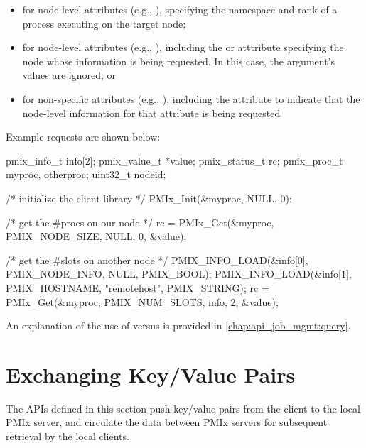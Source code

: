 \begin{itemize}
\item for node-level attributes (e.g., ), specifying the namespace and rank of a process executing on the target node;
\item for node-level attributes (e.g., ), including the  or  atttribute specifying the node whose information is being requested. In this case, the  argument's values are ignored; or
\item for non-specific attributes (e.g., ), including the  attribute to indicate that the node-level information for that attribute is being requested
\end{itemize}

Example requests are shown below:

\cspecificstart
\begin{codepar}
pmix_info_t info[2];
pmix_value_t *value;
pmix_status_t rc;
pmix_proc_t myproc, otherproc;
uint32_t nodeid;

/* initialize the client library */
PMIx_Init(&myproc, NULL, 0);

/* get the #procs on our node */
rc = PMIx_Get(&myproc, PMIX_NODE_SIZE, NULL, 0, &value);

/* get the #slots on another node */
PMIX_INFO_LOAD(&info[0], PMIX_NODE_INFO, NULL, PMIX_BOOL);
PMIX_INFO_LOAD(&info[1], PMIX_HOSTNAME, "remotehost", PMIX_STRING);
rc = PMIx_Get(&myproc, PMIX_NUM_SLOTS, info, 2, &value);

\end{codepar}
\cspecificend

\adviceuserstart
An explanation of the use of  versus  is provided in \ref{chap:api_job_mgmt:query}.
\adviceuserend

\section{Exchanging Key/Value Pairs}
\label{chap:api_kv_mgmt:exchange}

The APIs defined in this section push key/value pairs from the client to the local \ac{PMIx} server, and circulate the data between \ac{PMIx} servers for subsequent retrieval by the local clients.

\subsection{}

